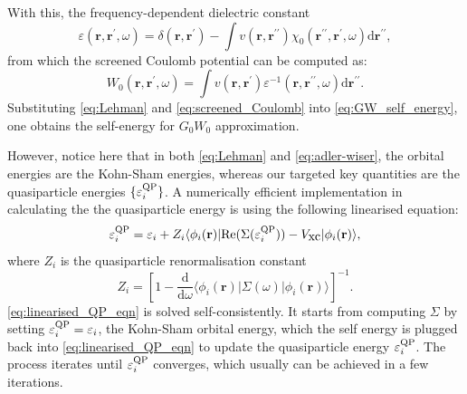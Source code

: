 With this, the frequency-dependent dielectric constant 
\begin{equation}
    \label{eq:freq_dielectric_constant}
    \varepsilon(\bm{r},\bm{r}^\prime,\omega)=\delta(\bm{r},\bm{r}^\prime)-\int  v(\bm{r},\bm{r}^{\prime\prime})\chi_0  (\bm{r}^{\prime\prime},\bm{r}^\prime,\omega)\mbox{d}\bm{r}^{\prime\prime},
\end{equation}
from which the  screened Coulomb potential can be computed as:
\begin{equation}
    \label{eq:screened_Coulomb}
    W_0 (\bm{r},\bm{r}^{\prime},\omega)=\int v(\bm{r},\bm{r}^\prime)\varepsilon^{-1}(\bm{r},\bm{r}^{\prime\prime},\omega)\mbox{d} \bm{r}^{\prime\prime}. 
\end{equation}
Substituting \cref{eq:Lehman} and  \cref{eq:screened_Coulomb} into \cref{eq:GW_self_energy}, one obtains the self-energy for $G_0 W_0$ approximation. 

However, notice here that in both \cref{eq:Lehman} and \cref{eq:adler-wiser}, the orbital energies are the Kohn-Sham energies, whereas our targeted key quantities are the quasiparticle energies $\{\varepsilon_i^{\mbox{\scriptsize{QP}}}\}$.  A numerically efficient implementation in calculating the the quasiparticle energy is using the following linearised equation:\cite{liu2016cubic,wilhelm2016gw}
\begin{equation}
    \label{eq:linearised_QP_eqn}
    \varepsilon_{i}^{\mbox{\scriptsize{QP}}}= \varepsilon_{i}+Z_{i}\langle \phi_i(\mathbf{r})|\mbox{Re}(\Sigma(\varepsilon_{i}^{\mbox{\scriptsize{QP}}}))-V_{\mbox{xc}}|\phi_{i}(\mathbf{r}) \rangle,
\end{equation}
where $Z_i$ is the quasiparticle renormalisation constant
\begin{equation}
    \label{eq:QP_renormal_const}
    Z_i=\left[1-\frac{\mathrm{d}}{\mathrm{d}\omega}\langle \phi_i(\bm{r})|\Sigma (\omega)|\phi_i(\bm{r})\rangle\right]^{-1}.
\end{equation}
\cref{eq:linearised_QP_eqn} is solved self-consistently. It starts from computing $\Sigma$ by setting $\varepsilon_{i}^{\mbox{\scriptsize{QP}}}=\varepsilon_i$, the Kohn-Sham orbital energy, which the self energy is plugged back into  \cref{eq:linearised_QP_eqn} to update the quasiparticle energy $\varepsilon_{i}^{\mbox{\scriptsize{QP}}}$. The process iterates until $\varepsilon_{i}^{\mbox{\scriptsize{QP}}}$ converges, which usually can be achieved in a few iterations. 
